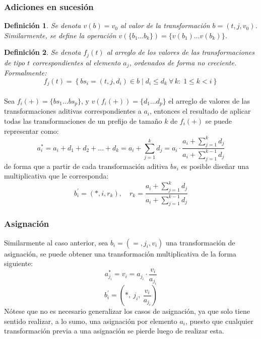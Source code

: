 \documentclass{article}
\theoremstyle{default}
\newtheorem*{definition}{Definición}
\begin{document}
	\subsubsection{Adiciones en sucesión}
		\begin{definition}
			Se denota $v(b) = v_0$ al valor de la transformación $b = (t,j,v_0)$. Similarmente, se define la operación $v(\{b_1 \dots b_k\}) = \{v(b_1) \dots v(b_k)\}$.
		\end{definition}

		\begin{definition}
			Se denota $f_j(t)$ al arreglo de los valores de las transformaciones de tipo $t$ correspondientes al elemento $a_j$, ordenados de forma no creciente. Formalmente:
			\begin{equation*}
				f_j(t) = \left\{
					bs_i = (t, j, d_i) \in b
					{\;\Big\vert\;}
					d_i \leq d_k \ \forall\,k:\; 1 \leq k < i
				\right\}
			\end{equation*}
		\end{definition}

		\paragraph{}Sea $f_i(+) = \{bs_1 \dots bs_p\}$, y $v(f_i(+)) = \{d_1 \dots d_p\}$ el arreglo de valores de las transformaciones aditivas correspondientes a $a_i$, entonces el resultado de aplicar todas las transformaciones de un prefijo de tamaño $k$ de $f_i(+)$ se puede representar como:
%
		\begin{equation}
			a_i^{*} = a_i + d_1 + d_2 + \dots + d_k
					= a_i + \sum\limits_{j=1}^{k}{d_j}
					= a_i \cdot \frac{ a_i + \sum\limits_{j=1}^{k}{d_j} }
									 {a_i + \sum\limits_{j=1}^{k-1}{d_j}}
		\end{equation}
%
		de forma que a partir de cada transformación aditiva $bs_i$ es posible diseñar una multiplicativa que le corresponda:
%
		\begin{equation}\label{additive_equivalency}
			b_i^\prime = \left( * , i , r_k \right),\quad
			r_k = \frac{ a_i + \sum\limits_{j=1}^{k}{d_j} }
					   {a_i + \sum\limits_{j=1}^{k-1}{d_j}}
		\end{equation}
%
%
	\subsubsection{Asignación}
		Similarmente al caso anterior, sea $b_i = (=, j_i, v_i)$ una transformación de asignación, se puede obtener una transformación multiplicativa de la forma siguiente:
%
		\begin{equation*}
			a_{j_i}^* = v_i = a_{j_i} \cdot \dfrac{v_i}{a_{j_i}}
		\end{equation*}
		\begin{equation}\label{assignment_equivalency}
			b_i^\prime	= (*, \ j_i, \ \dfrac{v_i}{a_{j_i}})
		\end{equation}
%
		Nótese que no es necesario generalizar los casos de asignación, ya que solo tiene sentido realizar, a lo sumo, una asignación por elemento $a_i$, puesto que cualquier transformación previa a una asignación se pierde luego de realizar esta.
%		
\end{document}
